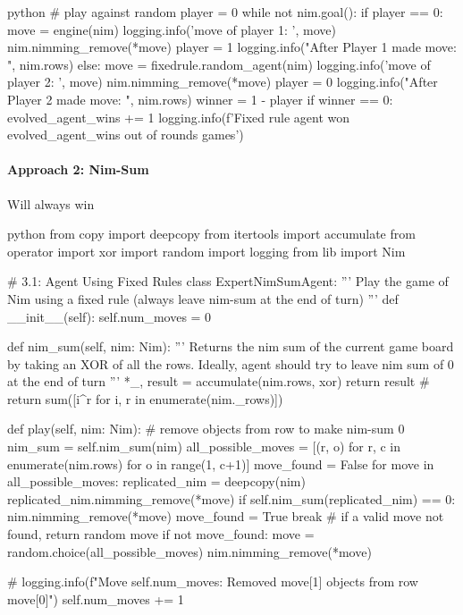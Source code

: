 \begin{mintedbox}{python}
            # play against random
            player = 0
            while not nim.goal():
                if player == 0:
                    move = engine(nim)
                    logging.info('move of player 1: ', move)
                    nim.nimming_remove(*move)
                    player = 1
                    logging.info("After Player 1 made move: ", nim.rows)
                else:
                    move = fixedrule.random_agent(nim)
                    logging.info('move of player 2: ', move)
                    nim.nimming_remove(*move)
                    player = 0
                    logging.info("After Player 2 made move: ", nim.rows)
            winner = 1 - player
            if winner == 0:
                evolved_agent_wins += 1
        logging.info(f'Fixed rule agent won {evolved_agent_wins} out of {rounds} games')
\end{mintedbox}

\paragraph{Approach 2: Nim-Sum} Will always win
\begin{mintedbox}{python}
from copy import deepcopy
from itertools import accumulate
from operator import xor
import random
import logging
from lib import Nim

# 3.1: Agent Using Fixed Rules
class ExpertNimSumAgent:
    '''
    Play the game of Nim using a fixed rule
    (always leave nim-sum at the end of turn)
    '''
    def __init__(self):
        self.num_moves = 0

    def nim_sum(self, nim: Nim):
        '''
        Returns the nim sum of the current game board
        by taking an XOR of all the rows.
        Ideally, agent should try to leave nim sum of 0 at the end of turn
        '''
        *_, result = accumulate(nim.rows, xor)
        return result
        # return sum([i^r for i, r in enumerate(nim._rows)])

    def play(self, nim: Nim):
        # remove objects from row to make nim-sum 0
        nim_sum = self.nim_sum(nim)
        all_possible_moves = [(r, o) for r, c in enumerate(nim.rows) for o in range(1, c+1)]
        move_found = False
        for move in all_possible_moves:
            replicated_nim = deepcopy(nim)
            replicated_nim.nimming_remove(*move)
            if self.nim_sum(replicated_nim) == 0:
                nim.nimming_remove(*move)
                move_found = True
                break
        # if a valid move not found, return random move
        if not move_found:
            move = random.choice(all_possible_moves)
            nim.nimming_remove(*move)

        # logging.info(f"Move {self.num_moves}: Removed {move[1]} objects from row {move[0]}")
        self.num_moves += 1
\end{mintedbox}

